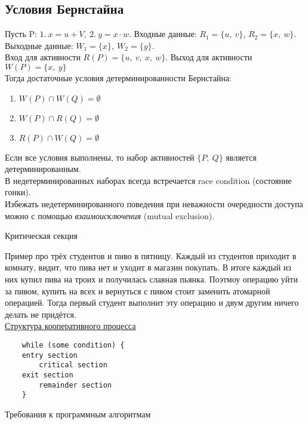 \documentclass[12pt, a4paper]{article}
\begin{document}
    \subsection*{Условия Бернстайна}
    Пусть P: $1.\ x = u + V,\ 2.\ y = x\cdot w$. Входные данные: $R_1 =\{u,\ v\}$, $R_2 = \{x,\ w\}$. Выходные данные: $W_1 = \{x\},\ W_2 = \{y\}$.\\
    Вход для активности $R(P) = \{u,\ v,\ x,\ w\}$. Выход для активности $W(P) = \{x,\ y\}$\\
    Тогда достаточные условия детерминированности Бернстайна:
    \begin{enumerate}
        \item $W(P)\cap W(Q) = \emptyset$
        \item $W(P) \cap R(Q) = \emptyset$
        \item $R(P) \cap W(Q) = \emptyset$
    \end{enumerate}
    Если все условия выполнены, то набор активностей $\{P,\ Q\}$ является детерминированным.\\
    В недетерминированных наборах всегда встречается race condition (состояние гонки).\\
    Избежать недетерминированного поведения при неважности очередности доступа можно с помощью \textit{взаимоисключения} (mutual exclusion).
    \begin{center}
        Критическая секция
    \end{center}
    Пример про трёх студентов и пиво в пятницу. Каждый из студентов приходит в комнату, видит, что пива нет и уходит в магазин покупать. В итоге каждый из них купил пива на троих и получилась славная пьянка. Поэтмоу операцию уйти за пивом, купить на всех и вернуться с пивом стоит заменить атомарной операцией. Тогда первый студент выполнит эту операцию и двум другим ничего делать не придётся.\\
    \underline{Структура кооперативного процесса}
    \begin{lstlisting}
    while (some condition) {
    entry section
        critical section
    exit section
        remainder section
    }
    \end{lstlisting}
    \begin{center}
        Требования к программным алгоритмам
    \end{center}
\end{document}
